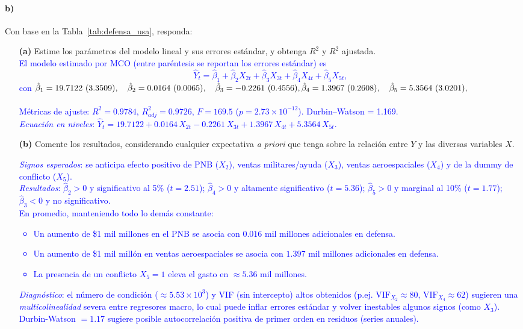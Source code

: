 \documentclass[10pt]{article}
\begin{document}
\paragraph*{b)} Con base en la Tabla~\ref{tab:defensa_usa}, responda:
\begin{enumerate}
    \item[\textbf{(a)}] Estime los parámetros del modelo lineal y sus errores estándar, y obtenga $R^2$ y $R^2$ ajustada.\\
    \textcolor{blue}{
        El modelo estimado por MCO (entre paréntesis se reportan los errores estándar) es
        \[
        \widehat{Y}_t=\hat{\beta}_1+\hat{\beta}_2X_{2t}+\hat{\beta}_3X_{3t}+\hat{\beta}_4X_{4t}+\hat{\beta}_5X_{5t},
        \]
        con
        $\hat{\beta}_1=19.7122\ (3.3509),\quad \hat{\beta}_2=0.0164\ (0.0065),\quad \hat{\beta}_3=-0.2261\ (0.4556),\\
        \hat{\beta}_4=1.3967\ (0.2608),\quad \hat{\beta}_5=5.3564\ (3.0201),$ \\
        \\
        Métricas de ajuste: \(R^2=0.9784\), \(R^2_{adj}=0.9726\), \(F=169.5\) (\(p=2.73\times10^{-12}\)). Durbin–Watson = 1.169.\\
        \textit{Ecuación en niveles}: \(\widehat{Y}_t=19.7122+0.0164\,X_{2t}-0.2261\,X_{3t}+1.3967\,X_{4t}+5.3564\,X_{5t}.\)
    }

    \item[\textbf{(b)}] Comente los resultados, considerando cualquier expectativa \textit{a priori}  que tenga sobre la relación entre $Y$ y las diversas variables $X$.\\
    \textcolor{blue}{
        \emph{Signos esperados}: se anticipa efecto positivo de PNB (\(X_2\)), ventas militares/ayuda (\(X_3\)), ventas aeroespaciales (\(X_4\)) y de la dummy de conflicto (\(X_5\)).\\
        \emph{Resultados}: \(\hat{\beta}_2>0\) y significativo al 5\% (\(t=2.51\)); \(\hat{\beta}_4>0\) y altamente significativo (\(t=5.36\)); \(\hat{\beta}_5>0\) y marginal al 10\% (\(t=1.77\)); \(\hat{\beta}_3<0\) y no significativo. \\
        En promedio, manteniendo todo lo demás constante:
        \begin{itemize}
        \item Un aumento de \$1 mil millones en el PNB se asocia con \(0.016\) mil millones adicionales en defensa.
        \item Un aumento de \$1 mil millón en ventas aeroespaciales se asocia con \(1.397\) mil millones adicionales en defensa.
        \item La presencia de un conflicto \(X_5=1\) eleva el gasto en \(\approx 5.36\) mil millones.
        \end{itemize}
        \emph{Diagnóstico}: el número de condición (\(\approx 5.53\times10^3\)) y VIF (sin intercepto) altos obtenidos (p.ej. \(\text{VIF}_{X_2}\approx 80\), \(\text{VIF}_{X_4}\approx 62\)) sugieren  una \textit{multicolinealidad} severa entre regresores macro, lo cual puede inflar errores estándar y volver inestables algunos signos (como \(X_3\)). Durbin-Watson \(=1.17\) sugiere posible autocorrelación positiva de primer orden en residuos (series anuales).
    }


\end{enumerate}
\end{document}
